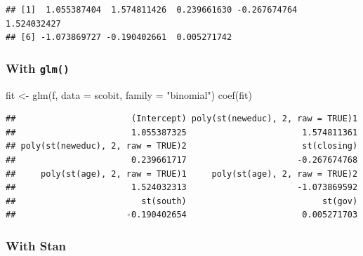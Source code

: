 \documentclass[
]{book}
\newenvironment{Shaded}{\begin{snugshade}}{\end{snugshade}}
\newcommand{\AttributeTok}[1]{\textcolor[rgb]{0.77,0.63,0.00}{#1}}
\newcommand{\CommentTok}[1]{\textcolor[rgb]{0.56,0.35,0.01}{\textit{#1}}}
\newcommand{\FunctionTok}[1]{\textcolor[rgb]{0.00,0.00,0.00}{#1}}
\newcommand{\NormalTok}[1]{#1}
\newcommand{\OtherTok}[1]{\textcolor[rgb]{0.56,0.35,0.01}{#1}}
\newcommand{\StringTok}[1]{\textcolor[rgb]{0.31,0.60,0.02}{#1}}
\begin{document}
\begin{verbatim}
## [1]  1.055387404  1.574811426  0.239661630 -0.267674764  1.524032427
## [6] -1.073869727 -0.190402661  0.005271742
\end{verbatim}

\begin{Shaded}
\end{Shaded}

\hypertarget{with-glm}{%
\subsubsection{\texorpdfstring{With \texttt{glm()}}{With glm()}}\label{with-glm}}

\begin{Shaded}
\begin{Highlighting}[]
\NormalTok{fit }\OtherTok{\textless{}{-}} \FunctionTok{glm}\NormalTok{(f, }\AttributeTok{data =}\NormalTok{ scobit, }\AttributeTok{family =} \StringTok{"binomial"}\NormalTok{)}
\FunctionTok{coef}\NormalTok{(fit)}
\end{Highlighting}
\end{Shaded}

\begin{verbatim}
##                       (Intercept) poly(st(neweduc), 2, raw = TRUE)1 
##                       1.055387325                       1.574811361 
## poly(st(neweduc), 2, raw = TRUE)2                       st(closing) 
##                       0.239661717                      -0.267674768 
##     poly(st(age), 2, raw = TRUE)1     poly(st(age), 2, raw = TRUE)2 
##                       1.524032313                      -1.073869592 
##                         st(south)                           st(gov) 
##                      -0.190402654                       0.005271703
\end{verbatim}

\hypertarget{with-stan}{%
\subsubsection{With Stan}\label{with-stan}}
\end{document}
